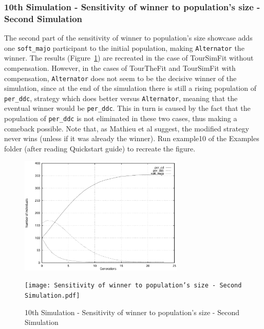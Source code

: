 \subsubsection{10th Simulation - Sensitivity of winner to population's size - Second Simulation}
The second part of the sensitivity of winner to population's size showcase adds one \texttt{soft\_majo} participant to the initial population, making \texttt{Alternator} the winner. The results (Figure~\ref{fig:Sensitivity of winner to population's size - Second Simulation}) are recreated in the case of TourSimFit without compensation. However, in the cases of TourTheFit and TourSimFit with compensation, \texttt{Alternator} does not seem to be the decisive winner of the simulation, since at the end of the simulation there is still a rising population of \texttt{per\_ddc}, strategy which does better versus \texttt{Alternator}, meaning that the eventual winner would be \texttt{per\_ddc}. This in turn is caused by the fact that the population of \texttt{per\_ddc} is not eliminated in these two cases, thus making a comeback possible. Note that, as Mathieu et al suggest, the modified strategy never wins (unless if it was already the winner). Run example10 of the Examples folder (after reading Quickstart guide) to recreate the figure.
	\begin{figure}[h]
	    \centering
		\includegraphics[width=0.7\textwidth]{RefPaperFigures/fig8b.jpeg}\par\vspace{0.5em}
	    \texttt{[image: Sensitivity of winner to population's size - Second Simulation.pdf]}
	    \caption{10th Simulation - Sensitivity of winner to population's size - Second Simulation}
	    \label{fig:Sensitivity of winner to population's size - Second Simulation}
	\end{figure}
